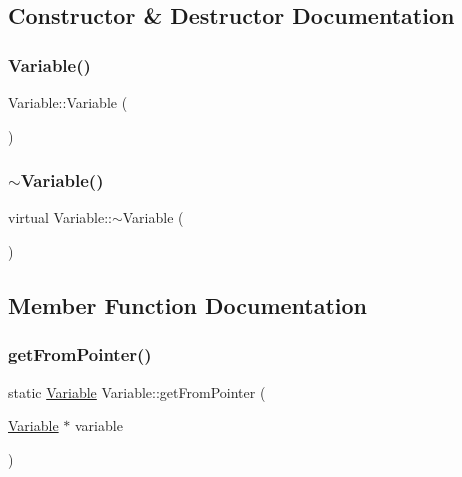 \subsection{Constructor \& Destructor Documentation}
\mbox{\label{classVariable_a5716c9dcafcc8cf59a6f6b5dac3ec7a2}} 
\subsubsection{\texorpdfstring{Variable()}{Variable()}}
{\footnotesize\ttfamily Variable\+::\+Variable (\begin{DoxyParamCaption}{ }\end{DoxyParamCaption})}

\mbox{\label{classVariable_abeaf0f45e2b8d0b063b567d6491604fd}} 
\subsubsection{\texorpdfstring{$\sim$\+Variable()}{~Variable()}}
{\footnotesize\ttfamily virtual Variable\+::$\sim$\+Variable (\begin{DoxyParamCaption}{ }\end{DoxyParamCaption})\hspace{0.3cm}{\ttfamily [virtual]}}



\subsection{Member Function Documentation}
\mbox{\label{classVariable_a9082f1e84cdaac510ddba4d491d990e0}} 
\subsubsection{\texorpdfstring{get\+From\+Pointer()}{getFromPointer()}}
{\footnotesize\ttfamily static \hyperlink{classVariable}{Variable} Variable\+::get\+From\+Pointer (\begin{DoxyParamCaption}\item[{\hyperlink{classVariable}{Variable} $\ast$}]{variable }\end{DoxyParamCaption})\hspace{0.3cm}{\ttfamily [static]}}

